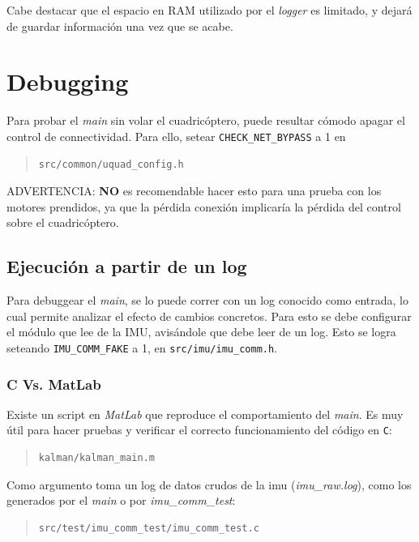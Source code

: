 \documentclass[main]{subfiles}
\begin{document}
Cabe destacar que el espacio en RAM utilizado por el \textit{logger} es limitado, y dejará de guardar información una vez que se acabe.

\section{Debugging}
\label{sec:codigo:debugging}

Para probar el \textit{main} sin volar el cuadricóptero, puede resultar cómodo apagar el control de connectividad. Para ello, setear \verb+CHECK_NET_BYPASS+ a 1 en
\begin{quote}
\begin{verbatim}
src/common/uquad_config.h
\end{verbatim}
\end{quote}

ADVERTENCIA: \textbf{NO} es recomendable hacer esto para una prueba con los motores prendidos, ya que la pérdida conexión implicaría la pérdida del control sobre el cuadricóptero.

\subsection{Ejecución a partir de un log}
\label{sec:codigo:ejecucion-a-partir-de-un-log}

Para debuggear el \textit{main}, se lo puede correr con un log conocido como entrada, lo cual permite analizar el efecto de cambios concretos. Para esto se debe configurar el módulo que lee de la IMU, avisándole que debe leer de un log. Esto se logra seteando \verb+IMU_COMM_FAKE+ a 1, en \verb+src/imu/imu_comm.h+.

\subsubsection{C Vs. MatLab}
\label{sec:codigo:c-vs-matlab}

Existe un script en \textit{MatLab} que reproduce el comportamiento del \textit{main}. Es muy útil para hacer pruebas y verificar el correcto funcionamiento del código en \verb+C+:

\begin{quote}
\begin{verbatim}
kalman/kalman_main.m
\end{verbatim}
\end{quote}

Como argumento toma un log de datos crudos de la imu (\textit{imu\_raw.log}), como los generados por el \textit{main} o por \textit{imu\_comm\_test}:
\begin{quote}
\begin{verbatim}
src/test/imu_comm_test/imu_comm_test.c
\end{verbatim}
\end{quote}
\end{document}
